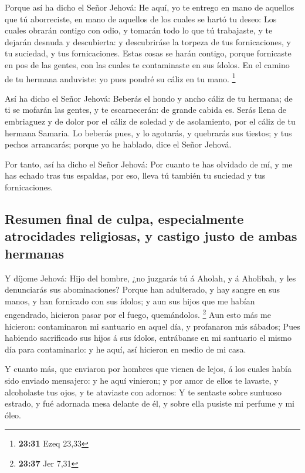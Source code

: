  Porque así ha dicho el Señor Jehová: He aquí, yo te
entrego en mano de aquellos que tú aborreciste, en mano de aquellos de
los cuales se hartó tu deseo:  Los cuales obrarán contigo
con odio, y tomarán todo lo que tú trabajaste, y te dejarán desnuda y
descubierta: y descubriráse la torpeza de tus fornicaciones, y tu
suciedad, y tus fornicaciones.  Estas cosas se harán
contigo, porque fornicaste en pos de las gentes, con las cuales te
contaminaste en sus ídolos.  En el camino de tu hermana
anduviste: yo pues pondré su cáliz en tu mano. \footnote{\textbf{23:31}
  Ezeq 23,33}

 Así ha dicho el Señor Jehová: Beberás el hondo y ancho
cáliz de tu hermana; de ti se mofarán las gentes, y te escarnecerán: de
grande cabida es.  Serás llena de embriaguez y de dolor
por el cáliz de soledad y de asolamiento, por el cáliz de tu hermana
Samaria.  Lo beberás pues, y lo agotarás, y quebrarás sus
tiestos; y tus pechos arrancarás; porque yo he hablado, dice el Señor
Jehová.

 Por tanto, así ha dicho el Señor Jehová: Por cuanto te
has olvidado de mí, y me has echado tras tus espaldas, por eso, lleva tú
también tu suciedad y tus fornicaciones.

\hypertarget{resumen-final-de-culpa-especialmente-atrocidades-religiosas-y-castigo-justo-de-ambas-hermanas}{%
\subsection{Resumen final de culpa, especialmente atrocidades
religiosas, y castigo justo de ambas
hermanas}\label{resumen-final-de-culpa-especialmente-atrocidades-religiosas-y-castigo-justo-de-ambas-hermanas}}

 Y díjome Jehová: Hijo del hombre, ¿no juzgarás tú á
Aholah, y á Aholibah, y les denunciarás sus abominaciones?
 Porque han adulterado, y hay sangre en sus manos, y han
fornicado con sus ídolos; y aun sus hijos que me habían engendrado,
hicieron pasar por el fuego, quemándolos. \footnote{\textbf{23:37} Jer
  7,31}  Aun esto más me hicieron: contaminaron mi
santuario en aquel día, y profanaron mis sábados;  Pues
habiendo sacrificado sus hijos á sus ídolos, entrábanse en mi santuario
el mismo día para contaminarlo: y he aquí, así hicieron en medio de mi
casa.

 Y cuanto más, que enviaron por hombres que vienen de
lejos, á los cuales había sido enviado mensajero: y he aquí vinieron; y
por amor de ellos te lavaste, y alcoholaste tus ojos, y te ataviaste con
adornos:  Y te sentaste sobre suntuoso estrado, y fué
adornada mesa delante de él, y sobre ella pusiste mi perfume y mi óleo.

